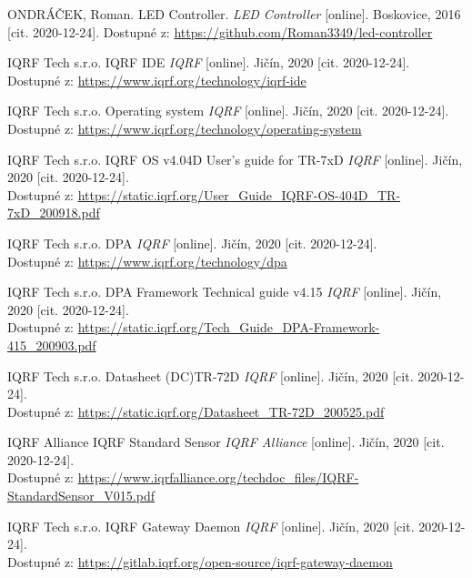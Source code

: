 \documentclass[12pt]{article}
\begin{document}
	\begin{thebibliography}{99}


ONDRÁČEK, Roman. LED Controller. \emph{LED Controller} [online]. Boskovice, 2016 [cit. 2020-12-24]. Dostupné z: \url{https://github.com/Roman3349/led-controller}

IQRF Tech s.r.o. IQRF IDE \emph{IQRF} [online]. Jičín, 2020 [cit. 2020-12-24]. \\ Dostupné z: \url{https://www.iqrf.org/technology/iqrf-ide}

IQRF Tech s.r.o. Operating system \emph{IQRF} [online]. Jičín, 2020 [cit. 2020-12-24]. \\ Dostupné z: \url{https://www.iqrf.org/technology/operating-system}

IQRF Tech s.r.o. IQRF OS v4.04D User's guide for TR-7xD \emph{IQRF} [online]. Jičín, 2020 [cit. 2020-12-24]. \\ Dostupné z: \url{https://static.iqrf.org/User_Guide_IQRF-OS-404D_TR-7xD_200918.pdf}

IQRF Tech s.r.o. DPA \emph{IQRF} [online]. Jičín, 2020 [cit. 2020-12-24]. \\ Dostupné z: \url{https://www.iqrf.org/technology/dpa}

IQRF Tech s.r.o. DPA Framework Technical guide v4.15 \emph{IQRF} [online]. Jičín, 2020 [cit. 2020-12-24]. \\ Dostupné z: \url{https://static.iqrf.org/Tech_Guide_DPA-Framework-415_200903.pdf}

IQRF Tech s.r.o. Datasheet (DC)TR-72D \emph{IQRF} [online]. Jičín, 2020 [cit. 2020-12-24]. \\ Dostupné z: \url{https://static.iqrf.org/Datasheet_TR-72D_200525.pdf}

IQRF Alliance IQRF Standard Sensor \emph{IQRF Alliance} [online]. Jičín, 2020 [cit. 2020-12-24]. \\ Dostupné z: \url{https://www.iqrfalliance.org/techdoc_files/IQRF-StandardSensor_V015.pdf}

IQRF Tech s.r.o. IQRF Gateway Daemon \emph{IQRF} [online]. Jičín, 2020 [cit. 2020-12-24]. \\ Dostupné z: \url{https://gitlab.iqrf.org/open-source/iqrf-gateway-daemon}


\end{thebibliography}
\end{document}
